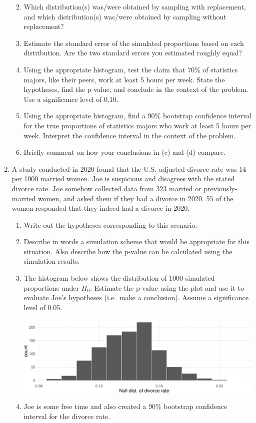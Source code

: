 \documentclass[
  letterpaper,
  DIV=11,
  numbers=noendperiod]{scrartcl}
\begin{document}
\begin{enumerate}
  \begin{enumerate}
  \def\labelenumii{\alph{enumii}.}
  \item
    Which distribution(s) was/were obtained by sampling with
    replacement, and which distribution(s) was/were obtained by sampling
    without replacement?
  \item
    Estimate the standard error of the simulated proportions based on
    each distribution. Are the two standard errors you estimated roughly
    equal?
  \item
    Using the appropriate histogram, test the claim that 70\% of
    statistics majors, like their peers, work at least 5 hours per week.
    State the hypotheses, find the p-value, and conclude in the context
    of the problem. Use a significance level of 0.10.
  \item
    Using the appropriate histogram, find a 90\% bootstrap confidence
    interval for the true proportions of statistics majors who work at
    least 5 hours per week. Interpret the confidence interval in the
    context of the problem.
  \item
    Briefly comment on how your conclusions in (c) and (d) compare.
  \end{enumerate}
\item
  A study conducted in 2020 found that the U.S. adjusted divorce rate
  was 14 per 1000 married women. Joe is suspicious and disagrees with
  the stated divorce rate. Joe somehow collected data from 323 married
  or previously-married women, and asked them if they had a divorce in
  2020. 55 of the women responded that they indeed had a divorce in
  2020.

  \begin{enumerate}
  \def\labelenumii{\alph{enumii}.}
  \item
    Write out the hypotheses corresponding to this scenario.
  \item
    Describe in words a simulation scheme that would be appropriate for
    this situation. Also describe how the p-value can be calculated
    using the simulation results.
  \item
    The histogram below shows the distribution of 1000 simulated
    proportions under \(H_{0}\). Estimate the p-value using the plot and
    use it to evaluate Joe's hypotheses (i.e.~make a conclusion). Assume
    a significance level of 0.05.

    \includegraphics{practice-13-intro_testing_files/figure-pdf/unnamed-chunk-4-1.pdf}
  \item
    Joe is some free time and also created a 90\% bootstrap confidence
    interval for the divorce rate.


\end{enumerate}
\end{enumerate}
\end{document}

